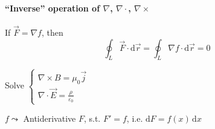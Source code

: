 \paragraph*{``Inverse'' operation of $\nabla$, $\nabla\cdot$, $\nabla\times$}

If $\overrightarrow{F}=\nabla f$, then
$$\oint_L\overrightarrow{F}\cdot\mathrm{d}\overrightarrow{r}=\oint_L\nabla f\cdot\mathrm{d}\overrightarrow{r}=0$$

Solve $\begin{cases}
        \nabla\times B=\mu_0\overrightarrow{j} \\
        \nabla\cdot\overrightarrow{E}=\frac{\rho}{\varepsilon_0}
    \end{cases}$

$f\leadsto$ Antiderivative $F$, s.t. $F'=f$, i.e. $\mathrm{d}F=f(x)\,\mathrm{d}x$